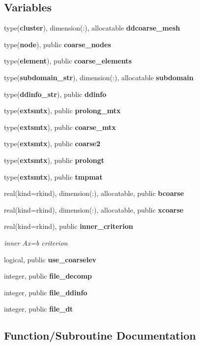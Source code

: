\subsection*{Variables}
\begin{DoxyCompactItemize}
\item 
type({\bf cluster}), dimension(\+:), allocatable {\bf ddcoarse\+\_\+mesh}
\item 
type({\bf node}), public {\bf coarse\+\_\+nodes}
\item 
type({\bf element}), public {\bf coarse\+\_\+elements}
\item 
type({\bf subdomain\+\_\+str}), dimension(\+:), allocatable {\bf subdomain}
\item 
type({\bf ddinfo\+\_\+str}), public {\bf ddinfo}
\item 
type({\bf extsmtx}), public {\bf prolong\+\_\+mtx}
\item 
type({\bf extsmtx}), public {\bf coarse\+\_\+mtx}
\item 
type({\bf extsmtx}), public {\bf coarse2}
\item 
type({\bf extsmtx}), public {\bf prolongt}
\item 
type({\bf extsmtx}), public {\bf tmpmat}
\item 
real(kind=rkind), dimension(\+:), allocatable, public {\bf bcoarse}
\item 
real(kind=rkind), dimension(\+:), allocatable, public {\bf xcoarse}
\item 
real(kind=rkind), public {\bf inner\+\_\+criterion}
\begin{DoxyCompactList}\small\item\em inner Ax=b criterion \end{DoxyCompactList}\item 
logical, public {\bf use\+\_\+coarselev}
\item 
integer, public {\bf file\+\_\+decomp}
\item 
integer, public {\bf file\+\_\+ddinfo}
\item 
integer, public {\bf file\+\_\+dt}
\end{DoxyCompactItemize}


\subsection{Function/\+Subroutine Documentation}
